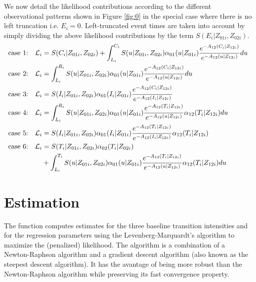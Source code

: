 \documentclass[article]{jss}
\begin{document}
We now detail the likelihood contributions according to the different
observational patterns shown in Figure \ref{fig:0} in the special
case where there is no left truncation i.e. \(E_i=0\).
Left-truncated event times are taken into account by simply dividing 
the above
likelihood contributions by the term \({S(E_{i}|Z_{01i},Z_{02i})}\).
\begin{equation}\label{eq:1}
 \begin{split}
 \text{case 1:}\quad {\cal L}_i & = S(C_i|Z_{01i},Z_{02i}) + \int_{L_i}^{C_i} S(u|Z_{01i},Z_{02i}) \alpha_{01}(u|Z_{01i}) \frac{e^{-{A}_{12}(C_i|Z_{12i})}}{e^{-{A}_{12}(u|Z_{12i})}}du \\
 \text{case 2:}\quad {\cal L}_i & = \int_{L_i} ^{R_i} S(u|Z_{01i},Z_{02i}) \alpha_{01}(u|Z_{01i}) \frac{e^{-{A}_{12}(C_i|Z_{12i})}}{e^{-{A}_{12}(u|Z_{12i})}}du\\
 \text{case 3:}\quad {\cal L}_i & =  S(I_i|Z_{01i},Z_{02i}) \alpha_{01}(I_i|Z_{01i}) \frac{e^{-{A}_{12}(C_i|Z_{12i})}}{e^{-{A}_{12}(I_i|Z_{12i})}}\\
 \text{case 4:}\quad {\cal L}_i & = \int_{L_i} ^{R_i} S(u|Z_{01i},Z_{02i}) \alpha_{01}(u|Z_{01i}) \frac{e^{-{A}_{12}(T_i|Z_{12i})}}{e^{-{A}_{12}(u|Z_{12i})}} \alpha_{12}(T_i|Z_{12i})du\\
 \text{case 5:}\quad  {\cal L}_i & =  S(I_i|Z_{01i},Z_{02i}) \alpha_{01}(I_i|Z_{01i}) \frac{e^{-{A}_{12}(T_i|Z_{12i})}}{e^{-{A}_{12}(I_i|Z_{12i})}} \alpha_{12}(T_i|Z_{12i})\\ 
 \text{case 6:}\quad {\cal L}_i & = S(T_i|Z_{01i},Z_{02i})\alpha_{02}(T_i|Z_{02i}) \\
  \qquad & + \int_{L_i}^{T_i} S(u|Z_{01i},Z_{02i}) \alpha_{01}(u|Z_{01i}) \frac{e^{-{A}_{12}(T_i|Z_{12i})}}{e^{-{A}_{12}(u|Z_{12i})}} \alpha_{12}(T_i|Z_{12i}) du \\
 \end{split}
 \end{equation}

\section{Estimation}
\label{sec-3}

The  function computes estimates for the three baseline
transition intensities and for the regression parameters using the
Levenberg-Marquardt's algorithm \citep{Levenberg_1944,Marquardt_1963}
to maximize the (penalized) likelihood.  The algorithm is a
combination of a Newton-Raphson algorithm and a gradient descent
algorithm (also known as the steepest descent algorithm). It has the
avantage of being more robust than the Newton-Raphson algorithm while
preserving its fast convergence property.
\end{document}
